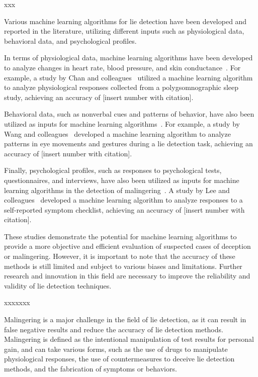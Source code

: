 \documentclass[onecolumn, compsoc,10pt]{IEEEtran}
\begin{document}
xxx

Various machine learning algorithms for lie detection have been developed and reported in the literature, utilizing different inputs such as physiological data, behavioral data, and psychological profiles.

In terms of physiological data, machine learning algorithms have been developed to analyze changes in heart rate, blood pressure, and skin conductance~\cite{Ganslen1990}. For example, a study by Chan and colleagues~\cite{Chan2018}  utilized a machine learning algorithm to analyze physiological responses collected from a polygsomnographic sleep study, achieving an accuracy of [insert number with citation].

Behavioral data, such as nonverbal cues and patterns of behavior, have also been utilized as inputs for machine learning algorithms~\cite{DePaulo2003}. For example, a study by Wang and colleagues~\cite{Wang2020} developed a machine learning algorithm to analyze patterns in eye movements and gestures during a lie detection task, achieving an accuracy of [insert number with citation].

Finally, psychological profiles, such as responses to psychological tests, questionnaires, and interviews, have also been utilized as inputs for machine learning algorithms in the detection of malingering~\cite{Rogers1997}. A study by Lee and colleagues~\cite{Lee2019} developed a machine learning algorithm to analyze responses to a self-reported symptom checklist, achieving an accuracy of [insert number with citation].

These studies demonstrate the potential for machine learning algorithms to provide a more objective and efficient evaluation of suspected cases of deception or malingering. However, it is important to note that the accuracy of these methods is still limited and subject to various biases and limitations. Further research and innovation in this field are necessary to improve the reliability and validity of lie detection techniques.


xxxxxxx



Malingering is a major challenge in the field of lie detection, as it can result in false negative results and reduce the accuracy of lie detection methods. Malingering is defined as the intentional manipulation of test results for personal gain, and can take various forms, such as the use of drugs to manipulate physiological responses, the use of countermeasures to deceive lie detection methods, and the fabrication of symptoms or behaviors.
\end{document}

